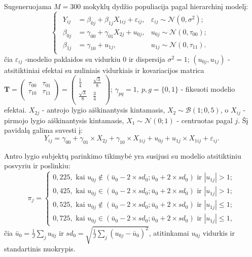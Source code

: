 \documentclass[11pt,a4paper]{article}
\begin{document}
\indent Sugeneruojama $M=300$ mokyklų dydžio populiacija pagal hierarchinį modelį:
\begin{equation*}\label{eq:wsimul}
\left\{
\begin{array}{l}
\begin{split}
Y_{ij}&=\beta_{0j}+\beta_{1j}X_{1ij}+\varepsilon_{ij}, &\varepsilon_{ij}\sim \mathcal{N}(0, \sigma^2);\\
\beta_{0j}&=\gamma_{00}+\gamma_{01}X_{2j}+u_{0j}, & u_{0j}\sim \mathcal{N}(0, \tau_{00});\\
\beta_{1j}&=\gamma_{10}+u_{1j}, & u_{1j}\sim \mathcal{N}(0, \tau_{11}).
\end{split}
\end{array} \right.
\end{equation*}
čia $\varepsilon_{ij}$ -modelio paklaidos su vidurkiu $0$ ir dispersija $\sigma^2=1$; $\left(u_{0j}, u_{1j}\right)$ - atsitiktiniai efektai su nuliniais vidurkiais ir kovariacijos matrica $\mathbf{T}=\begin{pmatrix}
\tau_{00} & \tau_{01} \\
\tau_{10} & \tau_{11} \\
\end{pmatrix}=\begin{pmatrix}
\frac{1}{4}& \frac{\sqrt{3}}{8} \\
 \frac{\sqrt{3}}{8} & \frac{3}{4}\\
\end{pmatrix}$; $\gamma_{pq}=1,\ p,g = \{0,1\}$ - fiksuoti modelio efektai. $X_{2j}$ - antrojo lygio aiškinantysis kintamasis, $X_2\sim \mathcal{B}(1;0,5)$, o $X_{ij}$ - pirmojo lygio aiškinantysis kintamasis, $X_1\sim \mathcal{N}(0;1)$ - centruotas pagal $j$. Šį pavidalą galima suvesti į:
\begin{equation*} \label{eq:wdeq}
Y_{ij} = \gamma_{00} +\gamma_{01}\times X_{2j}+ \gamma_{10}\times X_{1ij}+u_{0j}+u_{1j}\times X_{1ij}+\varepsilon_{ij}.
\end{equation*}

\indent Antro lygio subjektų parinkimo tikimybė yra susijusi su modelio atsitiktiniu posvyriu ir poslinkiu:
\begin{equation*}
\pi_j=
\left\{
\begin{array}{l}
0,225, \text{ kai } u_{0j} \notin \left(\bar{u}_0-2\times sd_0; \bar{u}_0+2\times sd_0\right) \text{ ir } |u_{1j}| > 1;\\
0,425, \text{ kai } u_{0j} \in \left(\bar{u}_0-2\times sd_0; \bar{u}_0+2\times sd_0\right) \text{ ir } |u_{1j}| > 1;\\
0,525, \text{ kai } u_{0j} \notin \left(\bar{u}_0-2\times sd_0; \bar{u}_0+2\times sd_0\right) \text{ ir } |u_{1j}| \leq 1;\\
0,725, \text{ kai } u_{0j} \in \left(\bar{u}_0-2\times sd_0; \bar{u}_0+2\times sd_0\right) \text{ ir } |u_{1j}| \leq 1,
\end{array} \right.
\end{equation*}
\noindent čia $\bar{u}_0=\frac{1}{J}\sum_ju_{0j}$ ir $sd_0=\sqrt{\frac{1}{J}\sum_j(u_{0j}-\bar{u}_0)^2}$, atitinkamai $u_{0j}$ vidurkis ir standartinis nuokrypis. 
\end{document}
